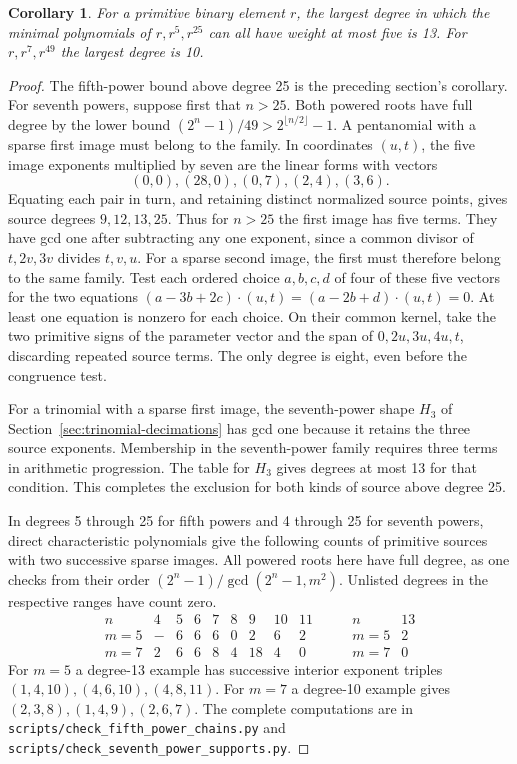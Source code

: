 \documentclass[11pt]{article}
\newtheorem{corollary}[theorem]{Corollary}
\begin{document}
\begin{corollary}
For a primitive binary element \(r\), the largest degree in which
the minimal polynomials of \(r,r^5,r^{25}\) can all have weight at
most five is 13. For \(r,r^7,r^{49}\) the largest degree is 10.
\end{corollary}
\begin{proof}
The fifth-power bound above degree 25 is the preceding section's
corollary. For seventh powers, suppose first that \(n>25\).
Both powered roots have full degree by the lower bound
\((2^n-1)/49>2^{\lfloor n/2\rfloor}-1\). A pentanomial with a
sparse first image must belong to the family. In coordinates
\((u,t)\), the five image exponents multiplied by seven are the
linear forms with vectors
\[
                   (0,0),(28,0),(0,7),(2,4),(3,6).
\]
Equating each pair in turn, and retaining distinct normalized source
points, gives source degrees \(9,12,13,25\). Thus for \(n>25\)
the first image has five terms. They have gcd one after subtracting
any one exponent, since a common divisor of \(t,2v,3v\) divides
\(t,v,u\). For a sparse second image, the first must therefore
belong to the same family. Test each ordered choice \(a,b,c,d\) of
four of these five vectors for the two equations
\((a-3b+2c)\cdot(u,t)=(a-2b+d)\cdot(u,t)=0\).
At least one equation is nonzero for each choice. On their common
kernel, take the two primitive signs of the parameter vector and the
span of \(0,2u,3u,4u,t\), discarding repeated source terms.
The only degree is eight, even before the congruence test.

For a trinomial with a sparse first image, the seventh-power shape
\(H_3\) of Section~\ref{sec:trinomial-decimations} has gcd one
because it retains the three source exponents. Membership in the
seventh-power family requires three terms in arithmetic progression.
The table for \(H_3\) gives degrees at most 13 for that condition.
This completes the exclusion for both kinds of source above degree 25.

In degrees 5 through 25 for fifth powers and 4 through 25 for
seventh powers, direct characteristic polynomials give the following
counts of primitive sources with two successive sparse images.
All powered roots here have full degree, as one checks from their
order \((2^n-1)/\gcd(2^n-1,m^2)\). Unlisted degrees in the
respective ranges have count zero.
\[
\begin{array}{c|rrrrrrrr}
 n&4&5&6&7&8&9&10&11\\\hline
 m=5&-&6&6&6&0&2&6&2\\
 m=7&2&6&6&8&4&18&4&0
\end{array}
\qquad
\begin{array}{c|r}
 n&13\\\hline
 m=5&2\\
 m=7&0
\end{array}
\]
For \(m=5\) a degree-13 example has successive interior exponent triples
\((1,4,10),(4,6,10),(4,8,11)\). For \(m=7\) a degree-10
example gives \((2,3,8),(1,4,9),(2,6,7)\).
The complete computations are in
\nolinkurl{scripts/check_fifth_power_chains.py} and
\nolinkurl{scripts/check_seventh_power_supports.py}.
\end{proof}
\end{document}

